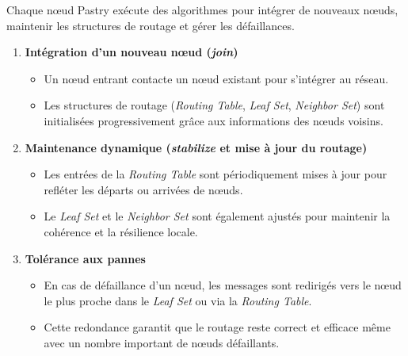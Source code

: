 Chaque nœud Pastry exécute des algorithmes pour intégrer de nouveaux nœuds, maintenir les structures de routage et gérer les défaillances.

\begin{enumerate}
    \item \textbf{Intégration d’un nouveau nœud (\textit{join})}
    \begin{itemize}
        \item Un nœud entrant contacte un nœud existant pour s’intégrer au réseau.
        \item Les structures de routage (\textit{Routing Table}, \textit{Leaf Set}, \textit{Neighbor Set}) sont initialisées progressivement grâce aux informations des nœuds voisins.
    \end{itemize}

    \item \textbf{Maintenance dynamique (\textit{stabilize} et mise à jour du routage)}
    \begin{itemize}
        \item Les entrées de la \textit{Routing Table} sont périodiquement mises à jour pour refléter les départs ou arrivées de nœuds.
        \item Le \textit{Leaf Set} et le \textit{Neighbor Set} sont également ajustés pour maintenir la cohérence et la résilience locale.
    \end{itemize}

    \item \textbf{Tolérance aux pannes}
    \begin{itemize}
        \item En cas de défaillance d’un nœud, les messages sont redirigés vers le nœud le plus proche dans le \textit{Leaf Set} ou via la \textit{Routing Table}.
        \item Cette redondance garantit que le routage reste correct et efficace même avec un nombre important de nœuds défaillants.
    \end{itemize}
\end{enumerate}
